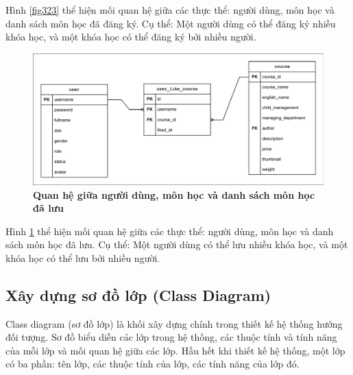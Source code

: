 \documentclass{article}
\begin{document}
	 Hình \ref{fig323} thể hiện mối quan hệ giữa các thực thể: người dùng, môn học và danh sách môn học đã đăng ký. Cụ thể: Một người dùng có thể đăng ký nhiều khóa học, và một khóa học có thể đăng ký bởi nhiều người.
	 
	 \begin{figure}[!ht]
	 	\centering
	 	\includegraphics[trim= 10pt 10pt 10pt 10pt, clip, width=15.5cm]{edr_fig324.pdf}
	 	\caption [Quan hệ giữa người dùng, môn học và danh sách môn học đã lưu]{\bfseries \fontsize{12pt}{0pt}\selectfont Quan hệ giữa người dùng, môn học và danh sách môn học đã lưu}
	 	\label{fig324}
	 \end{figure}
	 
	 Hình \ref{fig324} thể hiện mối quan hệ giữa các thực thể: người dùng, môn học và danh sách môn học đã lưu. Cụ thể: Một người dùng có thể lưu nhiều khóa học, và một khóa học có thể lưu bởi nhiều người.
	 
	 \subsection{Xây dựng sơ đồ lớp (Class Diagram)}
	 
	 Class diagram (sơ đồ lớp) là khối xây dựng chính trong thiết kế hệ thống hướng đối tượng. Sơ đồ biểu diễn các lớp trong hệ thống, các thuộc tính và tính năng của mỗi lớp và mối quan hệ giữa các lớp. Hầu hết khi thiết kế hệ thống, một lớp có ba phần: tên lớp, các thuộc tính của lớp, các tính năng của lớp đó.
\end{document}

